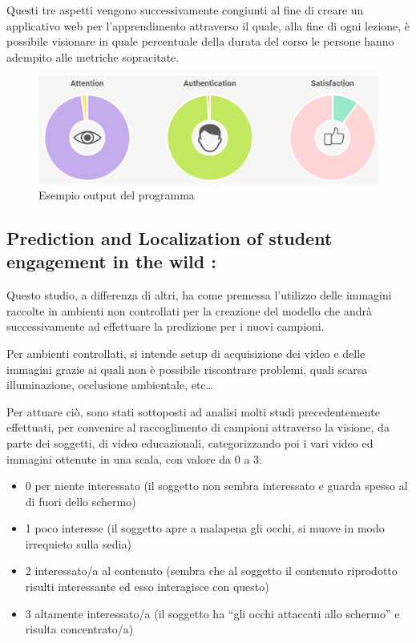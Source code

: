 Questi tre aspetti vengono successivamente congiunti al fine di creare un applicativo web per l’apprendimento attraverso il quale, alla fine di ogni lezione, è possibile visionare in quale percentuale della durata del corso le persone hanno adempito alle metriche sopracitate.

\begin{figure}
    \begin{center}    
        \includegraphics[width=1\linewidth]{images/3.png}
        \caption{Esempio output del programma}
    \end{center}
\end{figure}
 
\subsection{Prediction and Localization of student engagement in the wild \cite{PredLocStudEngagInTheWild}:}

Questo studio, a differenza di altri, ha come premessa l’utilizzo delle immagini raccolte in ambienti non controllati per la creazione del modello che andrà successivamente ad effettuare la predizione per i nuovi campioni.

Per ambienti controllati, si intende setup di acquisizione dei video e delle immagini grazie ai quali non è possibile riscontrare problemi, quali scarsa illuminazione, occlusione ambientale, etc…

Per attuare ciò, sono stati sottoposti ad analisi molti studi precedentemente effettuati, per convenire al raccoglimento di campioni attraverso la visione, da parte dei soggetti, di video educazionali, categorizzando poi i vari video ed immagini ottenute in una scala, con valore da 0 a 3:
\begin{itemize}
    \item 0 \textrightarrow per niente interessato (il soggetto non sembra interessato e guarda spesso al di fuori dello schermo)
    \item 1 \textrightarrow poco interesse (il soggetto apre a malapena gli occhi, si muove in modo irrequieto sulla sedia)
    \item 2 \textrightarrow interessato/a al contenuto (sembra che al soggetto il contenuto riprodotto risulti interessante ed esso interagisce con questo)
    \item 3 \textrightarrow altamente interessato/a (il soggetto ha “gli occhi attaccati allo schermo” e risulta concentrato/a)
\end{itemize}


